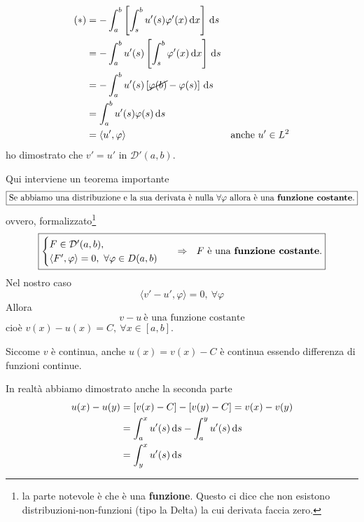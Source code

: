 \begin{dimostrazione}
    \begin{align*}
        (*) & =-\int ^{b}_{a}\left[\int ^{b}_{s} u'(s) \varphi '(x) \dx\right] \ds    &                            \\
            & =-\int ^{b}_{a} u'(s)\left[\int ^{b}_{s} \varphi '(x) \dx\right] \ds    &                            \\
            & =-\int ^{b}_{a} u'(s)\left[\cancel{\varphi (b)} -\varphi (s)\right] \ds &                            \\
            & =\int ^{b}_{a} u'(s) \varphi (s) \ds                                    &                            \\
            & =\langle u',\varphi \rangle                                             & \text{anche} \ u'\in L^{2}
    \end{align*}
    ho dimostrato che $v'=u'$ in $\mathcal{D} '(a,b)$.

    Qui interviene un teorema importante
    \begin{equation*}
        \boxed{\text{Se abbiamo una distribuzione e la sua derivata è nulla} \ \forall \varphi \ \text{allora è una \textbf{funzione costante}.}}
    \end{equation*}
    ovvero, formalizzato\footnote{la parte notevole è che è una \textbf{funzione}. Questo ci dice che non esistono distribuzioni-non-funzioni (tipo la Delta) la cui derivata faccia zero.}
    \begin{equation*}
        \boxed{
            \begin{cases}
                F\in \mathcal{D} '(a,b) , \\
                \langle F',\varphi \rangle =0,\ \forall \varphi \in D(a,b)
            \end{cases} \ \ \Rightarrow \ \ F\ \text{è una \textbf{funzione costante}.}}
    \end{equation*}
    Nel nostro caso
    \begin{equation*}
        \langle v'-u',\varphi \rangle =0,\ \forall \varphi
    \end{equation*}
    Allora
    \begin{equation*}
        v-u\ \text{è una funzione costante}
    \end{equation*}
    cioè $v(x) -u(x) =C,\ \forall x\in [ a,b]$.

    Siccome $v$ è continua, anche $u(x) =v(x) -C$ è continua essendo differenza di funzioni continue.

    In realtà abbiamo dimostrato anche la seconda parte
    \begin{align*}
        u(x) -u(y) & =[ v(x) -C] -[ v(y) -C] =v(x) -v(y)              \\
                   & =\int ^{x}_{a} u'(s) \,\mathrm d s-\int ^{y}_{a} u'(s) \,\mathrm d s \\
                   & =\int ^{x}_{y} u'(s) \,\mathrm d s
    \end{align*}
\end{dimostrazione}
